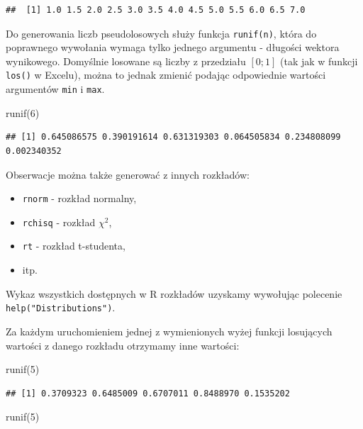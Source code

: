 \documentclass[
]{book}
\newenvironment{Shaded}{\begin{snugshade}}{\end{snugshade}}
\newcommand{\DecValTok}[1]{\textcolor[rgb]{0.00,0.00,0.81}{#1}}
\newcommand{\FunctionTok}[1]{\textcolor[rgb]{0.00,0.00,0.00}{#1}}
\newcommand{\NormalTok}[1]{#1}
\providecommand{\tightlist}{%
  \setlength{\itemsep}{0pt}\setlength{\parskip}{0pt}}
\begin{document}
\begin{verbatim}
##  [1] 1.0 1.5 2.0 2.5 3.0 3.5 4.0 4.5 5.0 5.5 6.0 6.5 7.0
\end{verbatim}

Do generowania liczb pseudolosowych służy funkcja \texttt{runif(n)}, która do poprawnego wywołania wymaga tylko jednego argumentu - długości wektora wynikowego. Domyślnie losowane są liczby z przedziału \([0;1]\) (tak jak w funkcji \texttt{los()} w Excelu), można to jednak zmienić podając odpowiednie wartości argumentów \texttt{min} i \texttt{max}.

\begin{Shaded}
\begin{Highlighting}[]
\FunctionTok{runif}\NormalTok{(}\DecValTok{6}\NormalTok{)}
\end{Highlighting}
\end{Shaded}

\begin{verbatim}
## [1] 0.645086575 0.390191614 0.631319303 0.064505834 0.234808099 0.002340352
\end{verbatim}

Obserwacje można także generować z innych rozkładów:

\begin{itemize}
\tightlist
\item
  \texttt{rnorm} - rozkład normalny,
\item
  \texttt{rchisq} - rozkład \(\chi^2\),
\item
  \texttt{rt} - rozkład t-studenta,
\item
  itp.
\end{itemize}

Wykaz wszystkich dostępnych w R rozkładów uzyskamy wywołując polecenie \texttt{help("Distributions")}.

Za każdym uruchomieniem jednej z wymienionych wyżej funkcji losujących wartości z danego rozkładu otrzymamy inne wartości:

\begin{Shaded}
\begin{Highlighting}[]
\FunctionTok{runif}\NormalTok{(}\DecValTok{5}\NormalTok{)}
\end{Highlighting}
\end{Shaded}

\begin{verbatim}
## [1] 0.3709323 0.6485009 0.6707011 0.8488970 0.1535202
\end{verbatim}

\begin{Shaded}
\begin{Highlighting}[]
\FunctionTok{runif}\NormalTok{(}\DecValTok{5}\NormalTok{)}
\end{Highlighting}
\end{Shaded}
\end{document}
